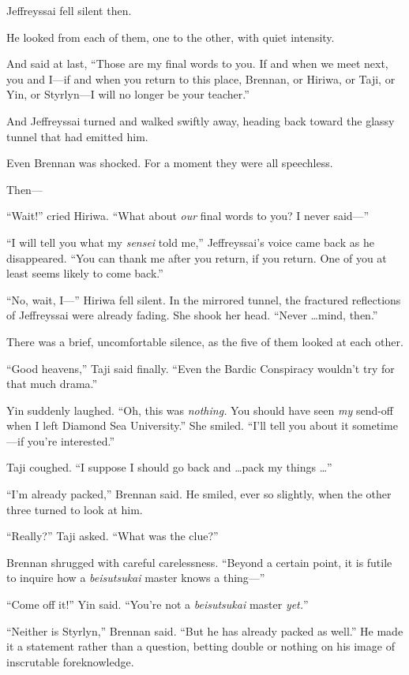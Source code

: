 {
 Jeffreyssai fell silent then.}

{
 He looked from each of them, one to the other, with quiet
intensity.}

{
 And said at last, ``Those are my final words to
you. If and when we meet next, you and I---if and when you return to
this place, Brennan, or Hiriwa, or Taji, or Yin, or Styrlyn---I will no
longer be your teacher.''}

{
 And Jeffreyssai turned and walked swiftly away, heading back
toward the glassy tunnel that had emitted him.}

{
 Even Brennan was shocked. For a moment they were all speechless.}

{
 Then---}

{
 ``Wait!'' cried Hiriwa.
``What about \textit{our} final words to you? I never
said---''}

{
 ``I will tell you what my \textit{sensei} told
me,'' Jeffreyssai's voice came back
as he disappeared. ``You can thank me after you
return, if you return. One of you at least seems likely to come
back.''}

{
 ``No, wait, I---'' Hiriwa fell
silent. In the mirrored tunnel, the fractured reflections of
Jeffreyssai were already fading. She shook her head.
``Never \ldots mind, then.''}

{
 There was a brief, uncomfortable silence, as the five of them
looked at each other.}

{
 ``Good heavens,'' Taji said
finally. ``Even the Bardic Conspiracy
wouldn't try for that much drama.''}

{
 Yin suddenly laughed. ``Oh, this was
\textit{nothing.} You should have seen \textit{my} send-off when I left
Diamond Sea University.'' She smiled.
``I'll tell you about it sometime---if
you're interested.''}

{
 Taji coughed. ``I suppose I should go back and
\ldots pack my things \ldots''}

{
 ``I'm already
packed,'' Brennan said. He smiled, ever so slightly,
when the other three turned to look at him.}

{
 ``Really?'' Taji asked.
``What was the clue?''}

{
 Brennan shrugged with careful carelessness.
``Beyond a certain point, it is futile to inquire how
a \textit{beisutsukai} master knows a thing---''}

{
 ``Come off it!'' Yin said.
``You're not a \textit{beisutsukai}
master \textit{yet.}''}

{
 ``Neither is Styrlyn,'' Brennan
said. ``But he has already packed as
well.'' He made it a statement rather than a
question, betting double or nothing on his image of inscrutable
foreknowledge.}

